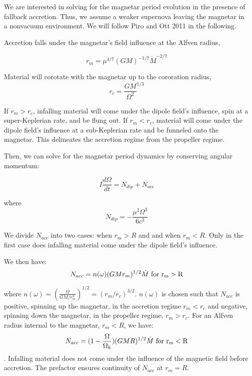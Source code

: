 \documentclass{article}
\begin{document}
We are interested in solving for the magnetar period evolution in the presence of fallback accretion. Thus, we assume a weaker supernova leaving the magnetar in a nonvacuum environment.  We will follow Piro and Ott 2011 \cite{Piro:2011ed} in the following. \smallskip

Accretion falls under the magnetar's field influence at the Alfven radius,

\begin{equation}
r_m=\mu^{4/7}(G M)^{-1/7} \dot{M}^{-2/7}
\end{equation}

Material will corotate with the magnetar up to the cororation radius,
\begin{equation}
r_c=\frac{GM}{\Omega^2}^{1/3}
\end{equation}

If $r_m>r_c$, infalling material will come under the dipole field's influence, spin at a super-Keplerian rate, and be flung out. If $r_m<r_c$, material will come under the dipole field's influence at a sub-Keplerian rate and be funneled onto the magnetar. This delineates the accretion regime from the propeller regime.

Then, we can solve for the magnetar period dynamics by conserving angular momentum:

\begin{equation}
I \frac{d\Omega}{dt} = N_{dip} + N_{acc}
\end{equation}

where
\begin{equation}
N_{dip}= -\frac{\mu^{2}\Omega^{3}}{6 c^{3}}
\end{equation}

We divide $N_{acc}$ into two cases: when $r_m>R$ and and when $r_m<R$. Only in the first case does infalling material come under the dipole field's influence.

We then have:
\begin{equation}
N_{acc}= n(\omega) (GMr_m)^{1/2} \dot{M}\, \,  \rm{for \,\, r_m>R}
\end{equation}

where $n(\omega)=(\frac{\Omega}{GM/r_m^3})^{1/2}=(r_m/r_c)^{3/2}$. $n(\omega)$ is chosen such that $N_{acc}$ is positive, spinning up the magnetar, in the accretion regime $r_m<r_c$ and negative, spinning down the magnetar, in the propeller regime, $r_m>r_c$. For an Alfven radius internal to the magnetar, $r_m<R$, we have:
\begin{equation}
N_{acc}=(1-\frac{\Omega}{\Omega_k})(GMR)^{1/2} \dot{M}\, \,  \rm{for \,\, r_m<R}
\end{equation}.
Infalling material does not come under the influence of the magnetic field before accretion. The prefactor ensures continuity of $N_{acc}$ at $r_m=R$.
\end{document}
